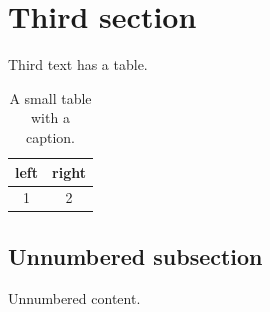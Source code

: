 \section{Third section}\label{sec:last}
Third text has a table.
\begin{table}[ht]
\centering
\begin{tabular}{c|c}
left & right \\
\hline
1 & 2 \\
\end{tabular}
\caption{A small table with a caption.}
\label{tab:small}
\end{table}
\subsection*{Unnumbered subsection}
Unnumbered content.
